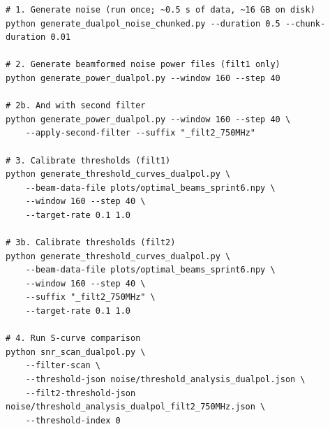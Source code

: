 \documentclass[11pt,letterpaper]{article}
\newenvironment{codebox}{%
  \begin{mdframed}[backgroundcolor=codebg,linewidth=0.5pt,innerleftmargin=6pt,innerrightmargin=6pt,innertopmargin=4pt,innerbottommargin=4pt]%
  \small}{\end{mdframed}}
\begin{document}
\begin{codebox}
\begin{Verbatim}
# 1. Generate noise (run once; ~0.5 s of data, ~16 GB on disk)
python generate_dualpol_noise_chunked.py --duration 0.5 --chunk-duration 0.01

# 2. Generate beamformed noise power files (filt1 only)
python generate_power_dualpol.py --window 160 --step 40

# 2b. And with second filter
python generate_power_dualpol.py --window 160 --step 40 \
    --apply-second-filter --suffix "_filt2_750MHz"

# 3. Calibrate thresholds (filt1)
python generate_threshold_curves_dualpol.py \
    --beam-data-file plots/optimal_beams_sprint6.npy \
    --window 160 --step 40 \
    --target-rate 0.1 1.0

# 3b. Calibrate thresholds (filt2)
python generate_threshold_curves_dualpol.py \
    --beam-data-file plots/optimal_beams_sprint6.npy \
    --window 160 --step 40 \
    --suffix "_filt2_750MHz" \
    --target-rate 0.1 1.0

# 4. Run S-curve comparison
python snr_scan_dualpol.py \
    --filter-scan \
    --threshold-json noise/threshold_analysis_dualpol.json \
    --filt2-threshold-json noise/threshold_analysis_dualpol_filt2_750MHz.json \
    --threshold-index 0
\end{Verbatim}
\end{codebox}
\end{document}
